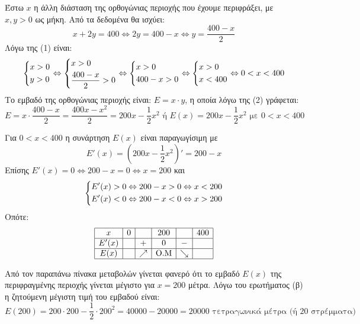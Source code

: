 \begin{alist}
    \item Έστω $x$ η άλλη διάσταση της ορθογώνιας περιοχής που έχουμε περιφράξει, με $x, y > 0$ ως μήκη. Από τα δεδομένα θα ισχύει:
    \[ x+2y=400 \Leftrightarrow 2y=400-x \Leftrightarrow y=\frac{400-x}{2} \tag{2} \]
    Λόγω της (1) είναι:
    \[ \begin{dcases*} x > 0 \\ y > 0 \end{dcases*} \Leftrightarrow \begin{dcases*} x > 0 \\ \frac{400-x}{2} > 0 \end{dcases*} \Leftrightarrow \begin{dcases*} x > 0 \\ 400-x > 0 \end{dcases*} \Leftrightarrow \begin{dcases*} x > 0 \\ x < 400 \end{dcases*} \Leftrightarrow 0 < x < 400 \]
    Το εμβαδό της ορθογώνιας περιοχής είναι: $E=x \cdot y$, η οποία λόγω της (2) γράφεται:
    \[ E=x \cdot \frac{400-x}{2} = \frac{400x-x^2}{2} = 200x - \frac{1}{2}x^2 \text{ ή } E(x) = 200x - \frac{1}{2}x^2 \text{ με } 0 < x < 400 \]

    \item Για $0 < x < 400$ η συνάρτηση $E(x)$ είναι παραγωγίσιμη με
    \[ E'(x) = \left(200x - \frac{1}{2}x^2\right)' = 200-x \]
    Επίσης $E'(x)=0 \Leftrightarrow 200-x=0 \Leftrightarrow x=200$ και
    \[ \begin{dcases*} E'(x) > 0 \Leftrightarrow 200-x > 0 \Leftrightarrow x < 200 \\ E'(x) < 0 \Leftrightarrow 200-x < 0 \Leftrightarrow x > 200 \end{dcases*} \]
    Οπότε:
    \[
    \begin{array}{|c|c|c|c|c|c|}
    \hline
    x & 0 & & 200 & & 400 \\
    \hline
    E'(x) & & + & 0 & - & \\
    \hline
    E(x) & & \nearrow & \text{O.M} & \searrow & \\
    \hline
    \end{array}
    \]

    \item Από τον παραπάνω πίνακα μεταβολών γίνεται φανερό ότι το εμβαδό $E(x)$ της περιφραγμένης περιοχής γίνεται μέγιστο για $x=200$ μέτρα.
    Λόγω του ερωτήματος (β) η ζητούμενη μέγιστη τιμή του εμβαδού είναι:
    \[ E(200) = 200 \cdot 200 - \frac{1}{2} \cdot 200^2 = 40000 - 20000 = 20000 \text{ τετραγωνικά μέτρα (ή } 20 \text{ στρέμματα)} \]


\end{alist}
